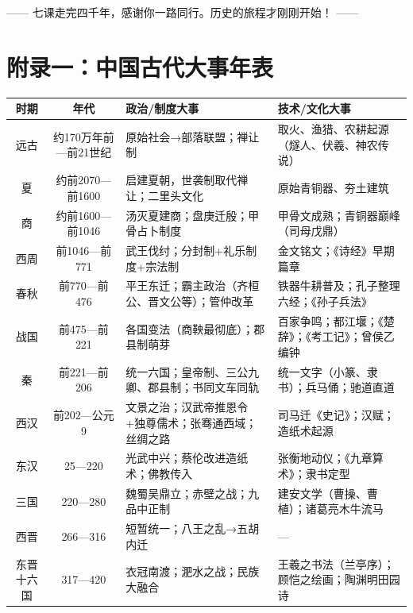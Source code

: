 \documentclass[a4paper,12pt]{ctexart}
\begin{document}
\vspace{0.5cm}
\begin{center}
\textcolor{blue!70!black}{\large —— 七课走完四千年，感谢你一路同行。历史的旅程才刚刚开始！ ——}
\end{center}

\newpage

\section*{\textcolor{blue!70!black}{附录一：中国古代大事年表}}

\vspace{0.2cm}
{\small
\begin{center}
\begin{tabular}{|c|c|p{6cm}|p{5cm}|}
\hline
\textbf{时期} & \textbf{年代} & \textbf{政治/制度大事} & \textbf{技术/文化大事} \\
\hline
远古 & 约170万年前—前21世纪 & 原始社会→部落联盟；禅让制 & 取火、渔猎、农耕起源（燧人、伏羲、神农传说） \\
\hline
夏 & 约前2070—前1600 & 启建夏朝，世袭制取代禅让；二里头文化 & 原始青铜器、夯土建筑 \\
\hline
商 & 约前1600—前1046 & 汤灭夏建商；盘庚迁殷；甲骨占卜制度 & 甲骨文成熟；青铜器巅峰（司母戊鼎） \\
\hline
西周 & 前1046—前771 & 武王伐纣；分封制+礼乐制度+宗法制 & 金文铭文；《诗经》早期篇章 \\
\hline
春秋 & 前770—前476 & 平王东迁；霸主政治（齐桓公、晋文公等）；管仲改革 & 铁器牛耕普及；孔子整理六经；《孙子兵法》 \\
\hline
战国 & 前475—前221 & 各国变法（商鞅最彻底）；郡县制萌芽 & 百家争鸣；都江堰；《楚辞》；《考工记》；曾侯乙编钟 \\
\hline
秦 & 前221—前206 & 统一六国；皇帝制、三公九卿、郡县制；书同文车同轨 & 统一文字（小篆、隶书）；兵马俑；驰道直道 \\
\hline
西汉 & 前202—公元9 & 文景之治；汉武帝推恩令+独尊儒术；张骞通西域；丝绸之路 & 司马迁《史记》；汉赋；造纸术起源 \\
\hline
东汉 & 25—220 & 光武中兴；蔡伦改进造纸术；佛教传入 & 张衡地动仪；《九章算术》；隶书定型 \\
\hline
三国 & 220—280 & 魏蜀吴鼎立；赤壁之战；九品中正制 & 建安文学（曹操、曹植）；诸葛亮木牛流马 \\
\hline
西晋 & 266—316 & 短暂统一；八王之乱→五胡内迁 & — \\
\hline
东晋十六国 & 317—420 & 衣冠南渡；淝水之战；民族大融合 & 王羲之书法（兰亭序）；顾恺之绘画；陶渊明田园诗 \\

\end{tabular}
\end{center}}
\end{document}
